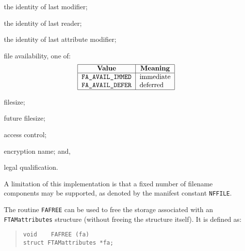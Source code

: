 \begin{describe}
\item[\verb"fa\_id\_modify":] the identity of last modifier;

\item[\verb"fa\_id\_read":] the identity of last reader;

\item[\verb"fa\_id\_attribute":] the identity of last attribute modifier;

\item[\verb"fa\_availability":] file availability,
one of:
\[\begin{tabular}{|l|l|}
\hline
    \multicolumn{1}{|c|}{\bf Value}&
		\multicolumn{1}{c|}{\bf Meaning}\\
\hline
    \tt FA\_AVAIL\_IMMED&	immediate\\
    \tt FA\_AVAIL\_DEFER&	deferred\\
\hline
\end{tabular}\]

\item[\verb"fa\_filesize":] filesize;

\item[\verb"fa\_futuresize":] future filesize;

\item[\verb"fa\_control":] access control;

\item[\verb"fa\_encrypt":] encryption name;
and,

\item[\verb"fa\_legal":] legal qualification.
\end{describe}
A limitation of this implementation
is that a fixed number of filename components may be supported,
as denoted by the manifest constant \verb"NFFILE".

The routine \verb"FAFREE" can be used to free the storage associated with an
\verb"FTAMattributes" structure (without freeing the structure itself).
It is defined as:
\begin{quote}\small\begin{verbatim}
void    FAFREE (fa)
struct FTAMattributes *fa;
\end{verbatim}\end{quote}

